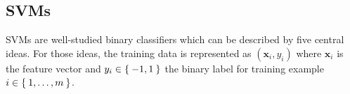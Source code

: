 
\subsection{SVMs}\label{subsec:trad-SVM}%

\Glspl{SVM} are well-studied binary classifiers which can be described by five
central ideas. For those ideas, the training data is represented as
$(\textbf{x}_i, y_i)$ where $\textbf{x}_i$ is the feature vector and $y_i \in
\Set{-1, 1}$ the binary label for training example $i \in \Set{1, \dots, m}$.


